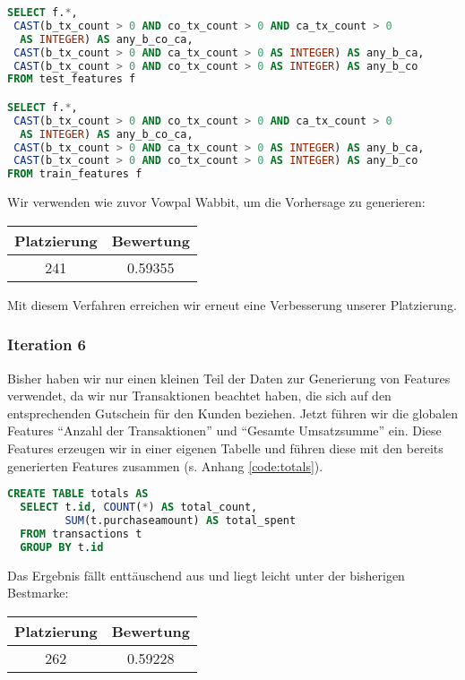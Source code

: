 \begin{lstlisting}[language=SQL]
SELECT f.*, 
 CAST(b_tx_count > 0 AND co_tx_count > 0 AND ca_tx_count > 0 
  AS INTEGER) AS any_b_co_ca,
 CAST(b_tx_count > 0 AND ca_tx_count > 0 AS INTEGER) AS any_b_ca,
 CAST(b_tx_count > 0 AND co_tx_count > 0 AS INTEGER) AS any_b_co
FROM test_features f

SELECT f.*, 
 CAST(b_tx_count > 0 AND co_tx_count > 0 AND ca_tx_count > 0 
  AS INTEGER) AS any_b_co_ca,
 CAST(b_tx_count > 0 AND ca_tx_count > 0 AS INTEGER) AS any_b_ca,
 CAST(b_tx_count > 0 AND co_tx_count > 0 AS INTEGER) AS any_b_co
FROM train_features f
\end{lstlisting}

Wir verwenden wie zuvor Vowpal Wabbit, um die Vorhersage zu generieren:

\begin{tabular}{|c|c|}
	\hline \textbf{Platzierung} & \textbf{Bewertung} \\ 
	\hline 241 & 0.59355  \\ 
	\hline 
\end{tabular}

Mit diesem Verfahren erreichen wir erneut eine Verbesserung unserer Platzierung.

\subsubsection{Iteration 6}
Bisher haben wir nur einen kleinen Teil der Daten zur Generierung von Features verwendet,
da wir nur Transaktionen beachtet haben, die sich auf den entsprechenden Gutschein für 
den Kunden beziehen. 
Jetzt führen wir die globalen Features "`Anzahl der Transaktionen"' und "`Gesamte Umsatzsumme"' ein. Diese Features erzeugen wir in einer eigenen Tabelle und führen diese mit den bereits generierten Features zusammen (s. Anhang \ref{code:totals}).

\begin{lstlisting}[language=SQL]
CREATE TABLE totals AS
  SELECT t.id, COUNT(*) AS total_count, 
         SUM(t.purchaseamount) AS total_spent
  FROM transactions t
  GROUP BY t.id
\end{lstlisting}

Das Ergebnis fällt enttäuschend aus und liegt leicht unter der bisherigen Bestmarke:

\begin{tabular}{|c|c|}
	\hline \textbf{Platzierung} & \textbf{Bewertung} \\ 
	\hline 262 & 0.59228  \\ 
	\hline 
\end{tabular}

